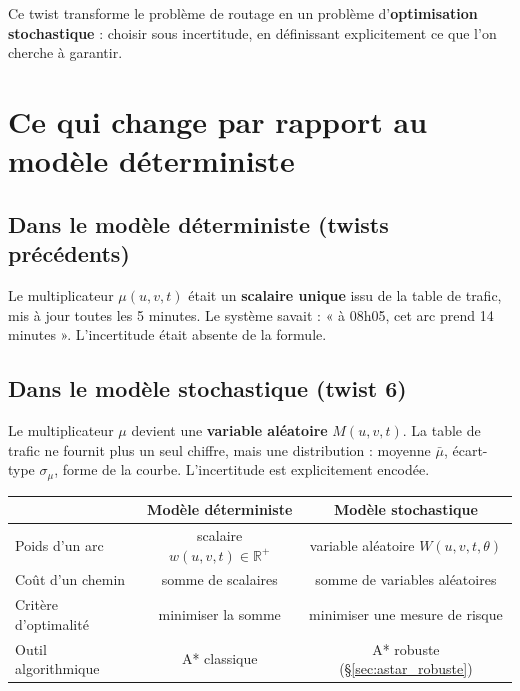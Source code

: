 \documentclass[12pt,a4paper]{article}
\theoremstyle{definition}
\theoremstyle{remark}
\begin{document}
Ce twist transforme le problème de routage en un problème
d'\textbf{optimisation stochastique} : choisir sous incertitude, en
définissant explicitement ce que l'on cherche à garantir.

\newpage

\section{Ce qui change par rapport au modèle déterministe}

\subsection{Dans le modèle déterministe (twists précédents)}

Le multiplicateur $\mu(u,v,t)$ était un \textbf{scalaire unique} issu
de la table de trafic, mis à jour toutes les 5 minutes. Le système
savait : « à 08h05, cet arc prend 14 minutes ». L'incertitude était
absente de la formule.

\subsection{Dans le modèle stochastique (twist 6)}

Le multiplicateur $\mu$ devient une \textbf{variable aléatoire}
$M(u,v,t)$. La table de trafic ne fournit plus un seul chiffre, mais
une distribution : moyenne $\bar{\mu}$, écart-type $\sigma_\mu$,
forme de la courbe. L'incertitude est explicitement encodée.

\begin{center}
\begin{tabular}{lcc}
  \toprule
  & \textbf{Modèle déterministe} & \textbf{Modèle stochastique} \\
  \midrule
  Poids d'un arc       & scalaire $w(u,v,t) \in \mathbb{R}^+$
                       & variable aléatoire $W(u,v,t,\theta)$ \\
  Coût d'un chemin     & somme de scalaires
                       & somme de variables aléatoires \\
  Critère d'optimalité & minimiser la somme
                       & minimiser une mesure de risque \\
  Outil algorithmique  & A* classique
                       & A* robuste (§\ref{sec:astar_robuste}) \\
  \bottomrule
\end{tabular}
\end{center}
\end{document}
